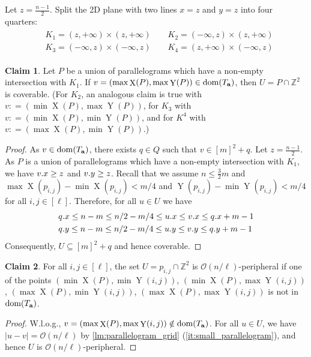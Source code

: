 \documentclass[11pt, letterpaper]{article}
\theoremstyle{plain}
\theoremstyle{definition}
\newtheorem{claim}{Claim}
\theoremstyle{remark}
\newcommand{\Z}{\mathbb{Z}}
\renewcommand{\O}{\mathcal{O}}
\DeclareMathOperator*{\X}{X}
\DeclareMathOperator*{\Y}{Y}
\begin{document}
Let $z = \frac{n - 1}{2}$. Split the 2D plane with two lines $x = z$ and $y = z$ into four quarters:
\begin{align}
\label{eq:quarters}
\begin{split}
&K_1 = (z, +\infty) \times (z, +\infty) \quad\quad K_2 = (-\infty, z) \times (z, +\infty)\\
&K_3 = (-\infty, z) \times (-\infty, z) \quad\quad K_4 = (z, +\infty) \times (-\infty, z)
\end{split}
\end{align}


\newcommand{\I}{\mathcal{I}}
\newcommand{\G}{\mathcal{G}}
\newcommand{\C}{\mathcal{C}}

\begin{claim}\label{coverable}
Let $P$ be a union of parallelograms which have a non-empty intersection with $K_1$. If $v = (\max \X(P), \max \Y(P)) \in \d{\Ta}$, then $U = P \cap \Z^2$ is coverable. (For $K_2$, an analogous claim is true with $v: = (\min \X(P), \max \Y(P))$, for $K_3$ with $v : = (\min \X(P), \min \Y(P))$, and for $K^4$ with $v : = (\max \X(P), \min \Y(P))$.)
\end{claim}
\begin{proof}
As $v \in \operatorname*{dom}(T_\mathbf{a})$, there exists $q \in Q$ such that $v \in [m]^2 + q$. Let $z = \frac{n - 1}{2}$. As $P$ is a union of parallelograms which have a non-empty intersection with $K_1$, we have $v.x \ge z$ and $v.y \ge z$. Recall that we assume $n \le \frac{3}{2} m$ and $\max \X(p_{i, j}) - \min \X(p_{i, j}) < m / 4$ and $\Y(p_{i, j}) - \min \Y(p_{i, j}) < m / 4$ for all $i, j \in [\ell]$. Therefore, for all $u \in U$ we have
\begin{align}
&q.x \le n-m \le n/2-m/4 \le u.x \le v.x \le q.x + m-1\\
&q.y \le n-m \le n/2-m/4 \le u.y \le v.y \le q.y + m-1 
\end{align}
\noindent Consequently, $U \subseteq [m]^2+q$ and hence coverable.
\end{proof}

\begin{claim}\label{peripheral}
For all $i,j \in [\ell]$, the set $U = p_{i,j} \cap \Z^2$ is $\O(n / \ell)$-peripheral if one of the points $(\min \X(P), \min \Y(i,j))$, $(\min \X(P), \max \Y(i,j))$, $(\max \X(P), \min \Y(i,j))$, $(\max \X(P), \max \Y(i,j))$ is not in $\operatorname*{dom}(T_\mathbf{a})$.
\end{claim}
\begin{proof}
W.l.o.g., $v = (\max \X(P), \max \Y(i,j)) \notin \d{\Ta}$. For all $u \in U$, we have $|u-v| = \O(n / \ell)$ by \cref{lm:parallelogram_grid} (\ref{it:small_parallelogram}), and hence $U$ is $\O(n / \ell)$-peripheral.
\end{proof}
\end{document}
